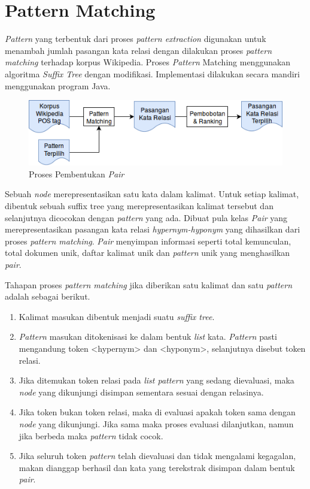 \section{Pattern Matching}
\textit{Pattern} yang terbentuk dari proses \textit{pattern extraction} digunakan untuk menambah jumlah pasangan kata relasi dengan dilakukan proses \textit{pattern matching} terhadap korpus Wikipedia. Proses \textit{Pattern} Matching menggunakan algoritma \textit{Suffix Tree} dengan modifikasi. Implementasi dilakukan secara mandiri menggunakan program Java.

\begin{figure}
    \centering
    \includegraphics[scale=0.6]{pics/Pic04-PatternMatching}
    \caption{Proses Pembentukan \textit{Pair}}
    \label{fig:pattern-matching}
\end{figure}

Sebuah \textit{node} merepresentasikan satu kata dalam kalimat. Untuk setiap kalimat, dibentuk sebuah suffix tree yang merepresentasikan kalimat tersebut dan selanjutnya dicocokan dengan \textit{pattern} yang ada. Dibuat pula kelas \textit{Pair} yang merepresentasikan pasangan kata relasi \textit{hypernym-hyponym} yang dihasilkan dari proses \textit{pattern matching}. \textit{Pair} menyimpan informasi seperti total kemunculan, total dokumen unik, daftar kalimat unik dan \textit{pattern} unik yang menghasilkan \textit{pair}.

Tahapan proses \textit{pattern matching} jika diberikan satu kalimat dan satu \textit{pattern} adalah sebagai berikut.
\begin{enumerate}
  \item Kalimat masukan dibentuk menjadi suatu \textit{suffix tree}.
  \item \textit{Pattern} masukan ditokenisasi ke dalam bentuk \textit{list} kata. \textit{Pattern} pasti mengandung token <hypernym> dan <hyponym>, selanjutnya disebut token relasi.
  \item Jika ditemukan token relasi pada \textit{list pattern} yang sedang dievaluasi, maka \textit{node} yang dikunjungi disimpan sementara sesuai dengan relasinya.
  \item Jika token bukan token relasi, maka di evaluasi apakah token sama dengan \textit{node} yang dikunjungi. Jika sama maka proses evaluasi dilanjutkan, namun jika berbeda maka \textit{pattern} tidak cocok.
  \item Jika seluruh token \textit{pattern} telah dievaluasi dan tidak mengalami kegagalan, makan dianggap berhasil dan kata yang terekstrak disimpan dalam bentuk \textit{pair}.
\end{enumerate}

